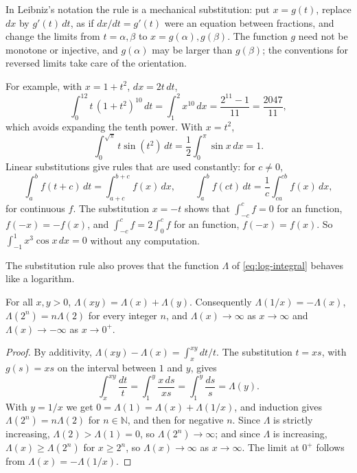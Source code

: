 In Leibniz's notation the rule is a mechanical substitution: put $x=g(t)$, replace $dx$ by $g'(t)\,dt$, as if $dx/dt=g'(t)$ were an equation between fractions, and change the limits from $t=\alpha,\beta$ to $x=g(\alpha),g(\beta)$. The function $g$ need not be monotone or injective, and $g(\alpha)$ may be larger than $g(\beta)$; the conventions for reversed limits take care of the orientation.

For example, with $x=1+t^2$, $dx=2t\,dt$,
\[
\int_0^12t\,(1+t^2)^{10}\,dt=\int_1^2x^{10}\,dx=\frac{2^{11}-1}{11}=\frac{2047}{11} ,
\]
which avoids expanding the tenth power. With $x=t^2$,
\[
\int_0^{\sqrt\pi}t\sin(t^2)\,dt=\frac12\int_0^\pi\sin x\,dx=1 .
\]
Linear substitutions give rules that are used constantly: for $c\ne0$,
\begin{equation}
\int_a^bf(t+c)\,dt=\int_{a+c}^{b+c}f(x)\,dx,\qquad\int_a^bf(ct)\,dt=\frac1c\int_{ca}^{cb}f(x)\,dx ,
\label{eq:linear-substitution}
\end{equation}
for continuous $f$. The substitution $x=-t$ shows that $\int_{-c}^cf=0$ for an  function, $f(-x)=-f(x)$, and $\int_{-c}^cf=2\int_0^cf$ for an  function, $f(-x)=f(x)$. So $\int_{-1}^1x^3\cos x\,dx=0$ without any computation.

The substitution rule also proves that the function $\Lambda$ of \eqref{eq:log-integral} behaves like a logarithm.

\begin{proposition}
\label{prop:log-additive}
For all $x,y>0$, $\Lambda(xy)=\Lambda(x)+\Lambda(y)$. Consequently $\Lambda(1/x)=-\Lambda(x)$, $\Lambda(2^n)=n\Lambda(2)$ for every integer $n$, and $\Lambda(x)\to\infty$ as $x\to\infty$ and $\Lambda(x)\to-\infty$ as $x\to0^+$.
\end{proposition}

\begin{proof}
By additivity, $\Lambda(xy)-\Lambda(x)=\int_x^{xy}dt/t$. The substitution $t=xs$, with $g(s)=xs$ on the interval between $1$ and $y$, gives
\[
\int_x^{xy}\frac{dt}t=\int_1^y\frac{x\,ds}{xs}=\int_1^y\frac{ds}s=\Lambda(y).
\]
With $y=1/x$ we get $0=\Lambda(1)=\Lambda(x)+\Lambda(1/x)$, and induction gives $\Lambda(2^n)=n\Lambda(2)$ for $n\in\mathbb N$, and then for negative $n$. Since $\Lambda$ is strictly increasing, $\Lambda(2)>\Lambda(1)=0$, so $\Lambda(2^n)\to\infty$; and since $\Lambda$ is increasing, $\Lambda(x)\ge\Lambda(2^n)$ for $x\ge2^n$, so $\Lambda(x)\to\infty$ as $x\to\infty$. The limit at $0^+$ follows from $\Lambda(x)=-\Lambda(1/x)$.
\end{proof}

